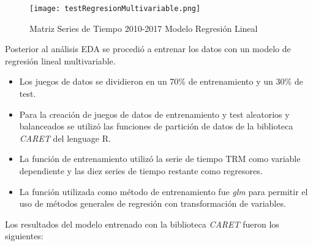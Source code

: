 \begin{figure}[H]
    \centering
    \texttt{[image: testRegresionMultivariable.png]}
    \caption{Matriz Series de Tiempo 2010-2017 Modelo Regresión Lineal}
\end{figure}   

Posterior al análisis EDA se procedió a entrenar los datos con un modelo de regresión lineal multivariable. 

\begin{itemize}
  \item Los juegos de datos se dividieron en un 70\% de entrenamiento y un 30\% de test. 
  \item Para la creación de juegos de datos de entrenamiento y test aleatorios y balanceados se utilizó las funciones de partición de datos de la biblioteca \emph{CARET} del lenguage R.
  \item La función de entrenamiento utilizó la serie de tiempo TRM como variable dependiente y las diez series de tiempo restante como regresores. 
  \item La función utilizada como método de entrenamiento fue \emph{glm} para permitir el uso de métodos generales de regresión con transformación de variables. 
\end{itemize}
  
Los resultados del modelo entrenado con la biblioteca \emph{CARET} fueron los siguientes:  
  
